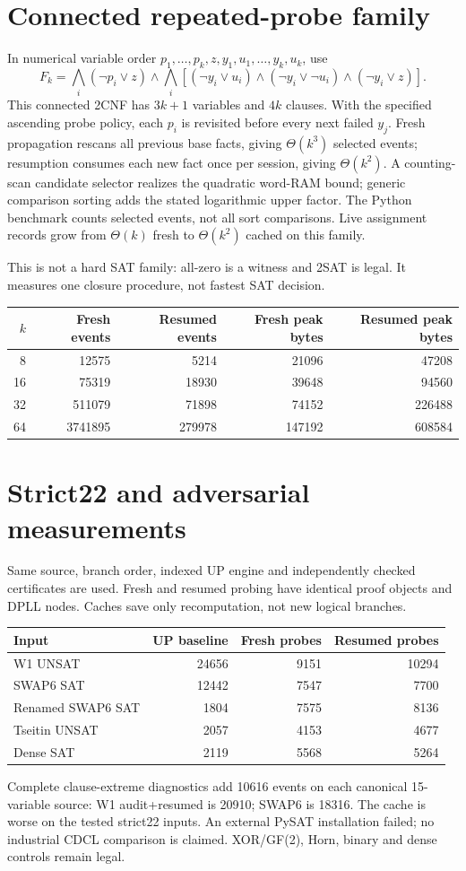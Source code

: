 \documentclass[11pt]{article}
\begin{document}
\section{Connected repeated-probe family}
In numerical variable order $p_1,\ldots,p_k,z,y_1,u_1,\ldots,y_k,u_k$, use
\[
F_k=\bigwedge_i(\neg p_i\vee z)\land\bigwedge_i[(\neg y_i\vee u_i)\land(\neg y_i\vee\neg u_i)\land(\neg y_i\vee z)].
\]
This connected 2CNF has $3k+1$ variables and $4k$ clauses. With the specified ascending probe policy, each $p_i$ is revisited before every next failed $y_j$. Fresh propagation rescans all previous base facts, giving $\Theta(k^3)$ selected events; resumption consumes each new fact once per session, giving $\Theta(k^2)$. A counting-scan candidate selector realizes the quadratic word-RAM bound; generic comparison sorting adds the stated logarithmic upper factor. The Python benchmark counts selected events, not all sort comparisons. Live assignment records grow from $\Theta(k)$ fresh to $\Theta(k^2)$ cached on this family.

This is not a hard SAT family: all-zero is a witness and 2SAT is legal. It measures one closure procedure, not fastest SAT decision.
\begin{center}\small
\begin{tabular}{rrrrr}
\toprule $k$&Fresh events&Resumed events&Fresh peak bytes&Resumed peak bytes\\\midrule
8&12575&5214&21096&47208\\
16&75319&18930&39648&94560\\
32&511079&71898&74152&226488\\
64&3741895&279978&147192&608584\\\bottomrule
\end{tabular}
\end{center}

\section{Strict22 and adversarial measurements}
Same source, branch order, indexed UP engine and independently checked certificates are used. Fresh and resumed probing have identical proof objects and DPLL nodes. Caches save only recomputation, not new logical branches.
\begin{center}\small
\begin{tabular}{lrrr}
\toprule Input&UP baseline&Fresh probes&Resumed probes\\\midrule
W1 UNSAT&24656&9151&10294\\
SWAP6 SAT&12442&7547&7700\\
Renamed SWAP6 SAT&1804&7575&8136\\
Tseitin UNSAT&2057&4153&4677\\
Dense SAT&2119&5568&5264\\\bottomrule
\end{tabular}
\end{center}
Complete clause-extreme diagnostics add 10616 events on each canonical 15-variable source: W1 audit+resumed is 20910; SWAP6 is 18316. The cache is worse on the tested strict22 inputs. An external PySAT installation failed; no industrial CDCL comparison is claimed. XOR/GF(2), Horn, binary and dense controls remain legal.
\end{document}

